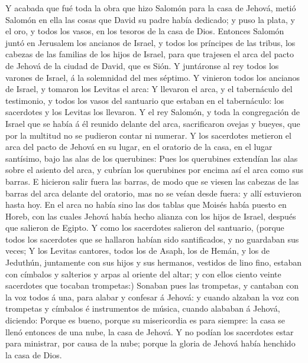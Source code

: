  Y acabada que fué toda la obra que hizo Salomón para la
casa de Jehová, metió Salomón en ella las cosas que David su padre había
dedicado; y puso la plata, y el oro, y todos los vasos, en los tesoros
de la casa de Dios.  Entonces Salomón juntó en Jerusalem los
ancianos de Israel, y todos los príncipes de las tribus, los cabezas de
las familias de los hijos de Israel, para que trajesen el arca del pacto
de Jehová de la ciudad de David, que es Sión.  Y juntáronse
al rey todos los varones de Israel, á la solemnidad del mes séptimo.
 Y vinieron todos los ancianos de Israel, y tomaron los
Levitas el arca:  Y llevaron el arca, y el tabernáculo del
testimonio, y todos los vasos del santuario que estaban en el
tabernáculo: los sacerdotes y los Levitas los llevaron.  Y
el rey Salomón, y toda la congregación de Israel que se había á él
reunido delante del arca, sacrificaron ovejas y bueyes, que por la
multitud no se pudieron contar ni numerar.  Y los sacerdotes
metieron el arca del pacto de Jehová en su lugar, en el oratorio de la
casa, en el lugar santísimo, bajo las alas de los querubines:
 Pues los querubines extendían las alas sobre el asiento del
arca, y cubrían los querubines por encima así el arca como sus barras.
 E hicieron salir fuera las barras, de modo que se viesen
las cabezas de las barras del arca delante del oratorio, mas no se veían
desde fuera: y allí estuvieron hasta hoy.  En el arca no
había sino las dos tablas que Moisés había puesto en Horeb, con las
cuales Jehová había hecho alianza con los hijos de Israel, después que
salieron de Egipto.  Y como los sacerdotes salieron del
santuario, (porque todos los sacerdotes que se hallaron habían sido
santificados, y no guardaban sus veces;  Y los Levitas
cantores, todos los de Asaph, los de Hemán, y los de Jeduthún,
juntamente con sus hijos y sus hermanos, vestidos de lino fino, estaban
con címbalos y salterios y arpas al oriente del altar; y con ellos
ciento veinte sacerdotes que tocaban trompetas:)  Sonaban
pues las trompetas, y cantaban con la voz todos á una, para alabar y
confesar á Jehová: y cuando alzaban la voz con trompetas y címbalos é
instrumentos de música, cuando alababan á Jehová, diciendo: Porque es
bueno, porque su misericordia es para siempre: la casa se llenó entonces
de una nube, la casa de Jehová.  Y no podían los sacerdotes
estar para ministrar, por causa de la nube; porque la gloria de Jehová
había henchido la casa de Dios.

